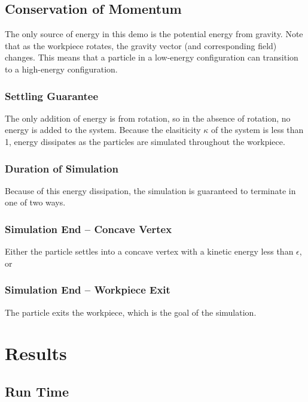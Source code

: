 
	\subsection{Conservation of Momentum}

		The only source of energy in this demo is the potential energy from gravity. Note that as the workpiece rotates, the gravity vector (and corresponding field) changes. This means that a particle in a low-energy configuration can transition to a high-energy configuration.

		\subsubsection{Settling Guarantee}

		The only addition of energy is from rotation, so in the absence of rotation, no energy is added to the system. Because the elasiticity $\kappa$ of the system is less than 1, energy dissipates as the particles are simulated throughout the workpiece.

		\subsubsection{Duration of Simulation}

		Because of this energy dissipation, the simulation is guaranteed to terminate in one of two ways.

		\subsubsection{Simulation End -- Concave Vertex}

		Either the particle settles into a concave vertex with a kinetic energy less than $\epsilon$, or

		\subsubsection{Simulation End -- Workpiece Exit}

		The particle exits the workpiece, which is the goal of the simulation.

\section{Results}

	\subsection{Run Time}

